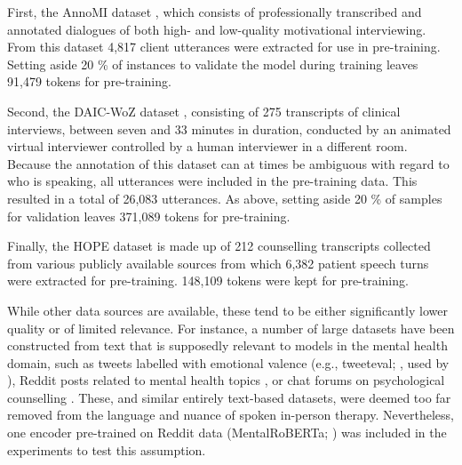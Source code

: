 \documentclass[12pt]{report}
\begin{document}
First, the AnnoMI dataset \cite{Wu2022}, which consists of professionally transcribed and annotated dialogues of both high- and low-quality motivational interviewing.
From this dataset 4,817 client utterances were extracted for use in pre-training.
Setting aside 20 \% of instances to validate the model during training leaves 91,479 tokens for pre-training.

Second, the DAIC-WoZ dataset \cite{Gratch2014}, consisting of 275 transcripts of clinical interviews, between seven and 33 minutes in duration, conducted by an animated virtual interviewer controlled by a human interviewer in a different room.
Because the annotation of this dataset can at times be ambiguous with regard to who is speaking, all utterances were included in the pre-training data.
This resulted in a total of 26,083 utterances. As above, setting aside 20 \% of samples for validation leaves 371,089 tokens for pre-training.

Finally, the HOPE dataset  is made up of 212 counselling transcripts collected from various publicly available sources from which 6,382 patient speech turns were extracted for pre-training.
148,109 tokens were kept for pre-training.

While other data sources are available, these tend to be either significantly lower quality or of limited relevance.
For instance, a number of large datasets have been constructed from text that is supposedly relevant to models in the mental health domain, such as tweets labelled with emotional valence (e.g., tweeteval; , used by ), Reddit posts related to mental health topics , or chat forums on psychological counselling \cite{counselchat}.
These, and similar entirely text-based datasets, were deemed too far removed from the language and nuance of spoken in-person therapy.
Nevertheless, one encoder pre-trained on Reddit data (MentalRoBERTa; ) was included in the experiments to test this assumption.
\end{document}
